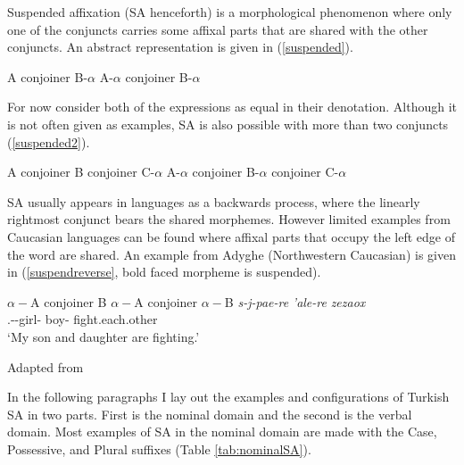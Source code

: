 
Suspended affixation (SA henceforth) is a morphological phenomenon where only one of the conjuncts carries some affixal parts that are shared with the other conjuncts. An abstract representation is given in (\ref{suspended}).
\begin{exe}
\ex \label{suspended}
\begin{xlist}
\ex \label{suspended1} A conjoiner B-$\alpha$
\ex A-$\alpha$ conjoiner B-$\alpha$
\end{xlist}
\end{exe}
For now consider both of the expressions as equal in their denotation. Although it is not often given as examples, SA is also possible with more than two conjuncts (\ref{suspended2}).
\begin{exe}
\ex \label{suspended2}
\begin{xlist}
\ex A conjoiner B conjoiner C-$\alpha$
\ex A-$\alpha$ conjoiner B-$\alpha$ conjoiner C-$\alpha$
\end{xlist}
\end{exe}
SA usually appears in languages as a backwards process, where the linearly rightmost conjunct bears the shared morphemes. However limited examples from Caucasian languages can be found \citep{erschler2012suspended, erschler2009possession} where affixal parts that occupy the left edge of the word are shared. An example from Adyghe (Northwestern Caucasian) is given in (\ref{suspendreverse}, bold faced morpheme is suspended).
\begin{exe}
\ex \label{suspendreverse}
    \begin{xlist}
        \ex $\alpha-$A conjoiner B
        \ex $\alpha-$A conjoiner $\alpha-$B
        \ex \gll 
        \textit{s-j\textschwa-p\textctc a\textctc e-re} \textit{\textteshlig'ale-re} \textit{zezaox} \\ {\First}.{\Sg}-{\All}-girl-{\And} boy-{\And} fight.each.other \\
        \glt `My son and daughter are fighting.'
    \end{xlist}
\hfill Adapted from \cite{erschler2012suspended}
\end{exe}

In the following paragraphs I lay out the examples and configurations of Turkish SA in two parts. First is the nominal domain and the second is the verbal domain. Most examples of SA in the nominal domain are made with the Case, Possessive, and Plural suffixes (Table \ref{tab:nominalSA}).

